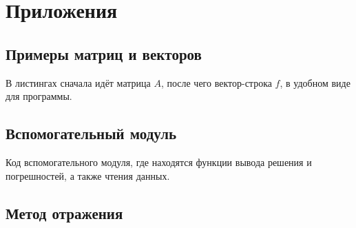 \section{Приложения} \label{appendices}
    \subsection{Примеры матриц и векторов}
        В листингах сначала идёт матрица $ A $, после чего вектор-строка $ f $, в удобном виде для программы.
        
        

        

        
        
        

        
        

        

    \subsection{Вспомогательный модуль}
        Код вспомогательного модуля, где находятся функции вывода решения и погрешностей, а также чтения данных.
        
    
    \subsection{Метод отражения}
        